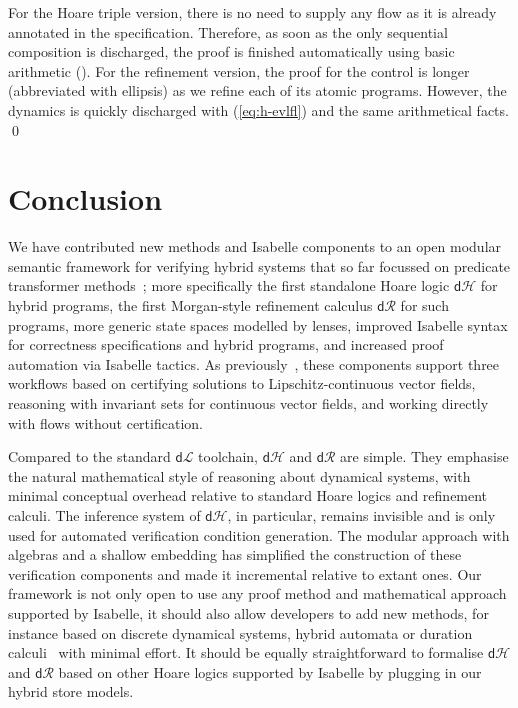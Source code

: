 \documentclass[envcountsame,envcountsect]{llncs}
\newcommand{\dL}{\mathsf{d}\mathcal{L}}
\newcommand{\dH}{\mathsf{d}\mathcal{H}}
\newcommand{\dR}{\mathsf{d}\mathcal{R}}
\begin{document}
\begin{example}
For the Hoare triple version, there is no need to supply any flow as
it is already annotated in the specification. Therefore, as soon as
the only sequential composition is discharged, the proof is finished
automatically using basic arithmetic
(). For the
refinement version, the proof for the control is longer (abbreviated with ellipsis) as we
refine each of its atomic programs. However, the dynamics is quickly
discharged with (\ref{eq:h-evlfl}) and the same arithmetical
facts. \qed
\end{example}




\section{Conclusion}\label{sec:conclusion}

We have contributed new methods and Isabelle components to an open
modular semantic framework for verifying hybrid systems that so far
focussed on predicate transformer methods~\cite{MuniveS19}; more
specifically the first standalone Hoare logic $\dH$ for hybrid
programs, the first Morgan-style refinement calculus $\dR$ for such
programs, more generic state spaces modelled by lenses, improved
Isabelle syntax for correctness specifications and hybrid programs,
and increased proof automation via Isabelle tactics.  As
previously~\cite{MuniveS19}, these components support three workflows
based on certifying solutions to Lipschitz-continuous vector fields,
reasoning with invariant sets for continuous vector fields, and
working directly with flows without certification.

Compared to the standard $\dL$ toolchain, $\dH$ and $\dR$ are
simple. They emphasise the natural mathematical style of reasoning
about dynamical systems, with minimal conceptual overhead relative to
standard Hoare logics and refinement calculi. The inference system of
$\dH$, in particular, remains invisible and is only used for automated
verification condition generation. The modular approach with algebras
and a shallow embedding has simplified the construction of these
verification components and made it incremental relative to extant
ones. Our framework is not only open to use any proof method and
mathematical approach supported by Isabelle, it should also allow
developers to add new methods, for instance based on discrete
dynamical systems, hybrid automata or duration
calculi~\cite{LiuLQZZZZ10} with minimal effort. It should be equally
straightforward to formalise $\dH$ and $\dR$ based on other Hoare
logics supported by Isabelle by plugging in our hybrid store models.
\end{document}
